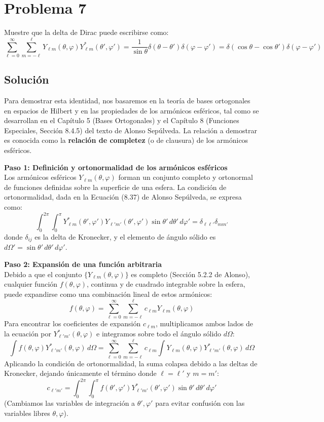 \documentclass[a4paper]{article}
\begin{document}
\section{Problema 7}
Muestre que la delta de Dirac puede escribirse como:
$$
\sum_{\ell=0}^{\infty} \sum_{m=-\ell}^{\ell} Y_{\ell m}(\theta, \varphi) Y_{\ell m}^*(\theta', \varphi') = \frac{1}{\sin\theta} \delta(\theta - \theta') \delta(\varphi - \varphi') = \delta(\cos\theta - \cos\theta') \delta(\varphi - \varphi')
$$

\subsection{Solución}
Para demostrar esta identidad, nos basaremos en la teoría de bases ortogonales en espacios de Hilbert y en las propiedades de los armónicos esféricos, tal como se desarrollan en el Capítulo 5 (Bases Ortogonales) y el Capítulo 8 (Funciones Especiales, Sección 8.4.5) del texto de Alonso Sepúlveda. La relación a demostrar es conocida como la \textbf{relación de completez} (o de clausura) de los armónicos esféricos.

\vspace{0.3cm}
\noindent\textbf{Paso 1: Definición y ortonormalidad de los armónicos esféricos} \\
Los armónicos esféricos $Y_{\ell m}(\theta, \varphi)$ forman un conjunto completo y ortonormal de funciones definidas sobre la superficie de una esfera. La condición de ortonormalidad, dada en la Ecuación (8.37) de Alonso Sepúlveda, se expresa como:
$$
\int_{0}^{2\pi} \int_{0}^{\pi} Y_{\ell m}^*(\theta', \varphi') Y_{\ell' m'}(\theta', \varphi') \sin\theta' \, d\theta' \, d\varphi' = \delta_{\ell \ell'} \delta_{m m'}
$$
donde $\delta_{ij}$ es la delta de Kronecker, y el elemento de ángulo sólido es $d\Omega' = \sin\theta' \, d\theta' \, d\varphi'$.

\vspace{0.3cm}
\noindent\textbf{Paso 2: Expansión de una función arbitraria} \\
Debido a que el conjunto $\{Y_{\ell m}(\theta, \varphi)\}$ es completo (Sección 5.2.2 de Alonso), cualquier función $f(\theta, \varphi)$, continua y de cuadrado integrable sobre la esfera, puede expandirse como una combinación lineal de estos armónicos:
$$
f(\theta, \varphi) = \sum_{\ell=0}^{\infty} \sum_{m=-\ell}^{\ell} c_{\ell m} Y_{\ell m}(\theta, \varphi)
$$
Para encontrar los coeficientes de expansión $c_{\ell m}$, multiplicamos ambos lados de la ecuación por $Y_{\ell' m'}^*(\theta, \varphi)$ e integramos sobre todo el ángulo sólido $d\Omega$:
$$
\int f(\theta, \varphi) Y_{\ell' m'}^*(\theta, \varphi) \, d\Omega = \sum_{\ell=0}^{\infty} \sum_{m=-\ell}^{\ell} c_{\ell m} \int Y_{\ell m}(\theta, \varphi) Y_{\ell' m'}^*(\theta, \varphi) \, d\Omega
$$
Aplicando la condición de ortonormalidad, la suma colapsa debido a las deltas de Kronecker, dejando únicamente el término donde $\ell = \ell'$ y $m = m'$:
$$
c_{\ell' m'} = \int_{0}^{2\pi} \int_{0}^{\pi} f(\theta', \varphi') Y_{\ell' m'}^*(\theta', \varphi') \sin\theta' \, d\theta' \, d\varphi'
$$
(Cambiamos las variables de integración a $\theta', \varphi'$ para evitar confusión con las variables libres $\theta, \varphi$).
\end{document}
